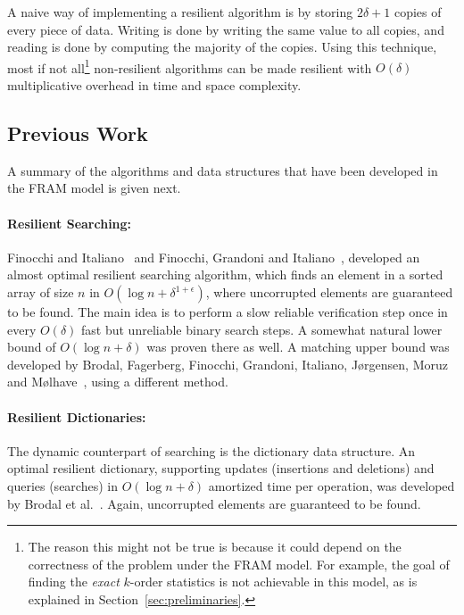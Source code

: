 \documentclass{llncs}
\begin{document}
A naive way of implementing a resilient algorithm is by storing $2\delta+1$ copies of every piece of data. Writing is done by writing the same value to all copies, and reading is done by computing the majority of the copies. Using this technique, most if not all\footnote{The reason this might not be true is because it could depend on the correctness of the problem under the FRAM model. For example, the goal of finding the \emph{exact} $k$-order statistics is not achievable  in this model, as is explained in Section~\ref{sec:preliminaries}.} non-resilient algorithms can be made resilient with $O(\delta)$ multiplicative overhead in time and space complexity.



\subsection{Previous Work}

A summary of the algorithms and data structures that have been developed in the FRAM model is given next.

\paragraph{Resilient Searching:} 
		
		Finocchi and Italiano~\cite{resilient_data_structures} and
		Finocchi, Grandoni and Italiano~\cite{resilient_sorting},
		developed an almost optimal resilient searching algorithm,
		which finds an element in a sorted array of size $n$ in $O(\log n + \delta^{1+\epsilon})$,
		where uncorrupted elements are guaranteed to be found.
		The main idea is to perform a slow reliable verification step once in every $O(\delta)$
		fast but unreliable binary search steps.    
		A somewhat natural lower bound of $O(\log n + \delta)$ was proven there as well.
		A matching upper bound was developed by
		Brodal, Fagerberg, Finocchi, Grandoni, Italiano, J{\o}rgensen, Moruz and M{\o}lhave~\cite{optimal_resilient_dictionaries},
		using a different method.

\paragraph{Resilient Dictionaries:}

	The dynamic counterpart of searching is the dictionary data structure.
	An optimal resilient dictionary,
	supporting updates (insertions and deletions) and queries (searches)
	in $O(\log n + \delta)$ amortized time per operation,
	was developed by Brodal et al.~\cite{optimal_resilient_dictionaries}.
	Again, uncorrupted elements are guaranteed to be found.
\end{document}
